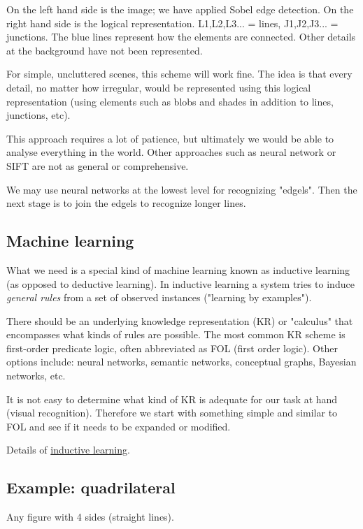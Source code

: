 On the left hand side is the image; we have applied  Sobel edge detection. On the right hand side is the logical representation. L1,L2,L3... = lines, J1,J2,J3... = junctions. The blue lines represent how the elements are connected. Other details at the background have not been represented.

For simple, uncluttered scenes, this scheme will work fine. The idea is that every detail, no matter how irregular, would be represented using this logical representation (using elements such as blobs and shades in addition to lines, junctions, etc).

This approach requires a lot of patience, but ultimately we would be able to analyse everything in the world. Other approaches such as neural network or SIFT are not as general or comprehensive.

We may use neural networks at the lowest level for recognizing "edgels". Then the next stage is to join the edgels to recognize longer lines.

\subsection{Machine learning}

What we need is a special kind of machine learning known as inductive learning (as opposed to deductive learning). In inductive learning a system tries to induce \emph{general rules} from a set of observed instances ("learning by examples").

There should be an underlying knowledge representation (KR) or  "calculus" that encompasses what kinds of rules are possible. The most common KR scheme is first-order predicate logic, often abbreviated as FOL (first order logic). Other options include: neural networks, semantic networks, conceptual graphs, Bayesian networks, etc.

It is not easy to determine what kind of KR is adequate for our task at hand (visual recognition). Therefore we start with something simple and similar to FOL and see if it needs to be expanded or modified.

Details of \href{Vis-InductiveLearning.htm}{inductive learning}. 

\subsection{Example: quadrilateral}

Any figure with 4 sides (straight lines).

